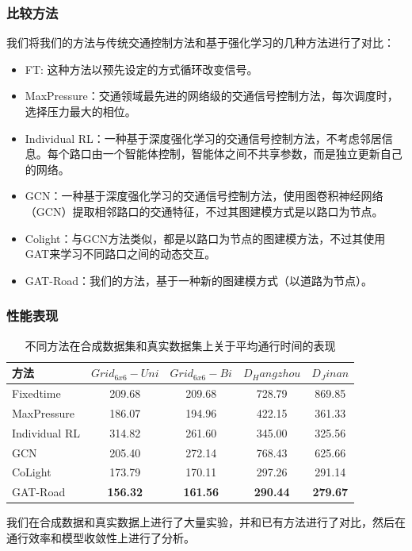 \subsubsection{比较方法}
我们将我们的方法与传统交通控制方法和基于强化学习的几种方法进行了对比：
\begin{itemize}
  \item FT\cite{koonce2008traffic}: 这种方法以预先设定的方式循环改变信号。
  \item MaxPressure\cite{varaiya2013max}：交通领域最先进的网络级的交通信号控制方法，每次调度时，选择压力最大的相位。
  \item Individual RL\cite{wei2018intellilight}：一种基于深度强化学习的交通信号控制方法，不考虑邻居信息。每个路口由一个智能体控制，智能体之间不共享参数，而是独立更新自己的网络。
  \item GCN\cite{van2016coordinated}：一种基于深度强化学习的交通信号控制方法，使用图卷积神经网络（GCN）提取相邻路口的交通特征，不过其图建模方式是以路口为节点。
  \item Colight\cite{wei2019colight}：与GCN方法类似，都是以路口为节点的图建模方法，不过其使用GAT来学习不同路口之间的动态交互。
  \item GAT-Road：我们的方法，基于一种新的图建模方式（以道路为节点）。
\end{itemize}
\subsubsection{性能表现}

\begin{table}[htb]
  \caption{不同方法在合成数据集和真实数据集上关于平均通行时间的表现}
  \label{tab:performance}
  \begin{tabular}{lcccc}
  \toprule
  方法 & $Grid_{6x6}-Uni$ & $Grid_{6x6}-Bi$ & $D_Hangzhou$ & $D_Jinan$ \\
  \hline
  Fixedtime & 209.68 & 209.68 & 728.79 & 869.85 \\
  MaxPressure & 186.07 & 194.96 &  422.15 & 361.33 \\
  \hline
  Individual RL & 314.82 & 261.60 & 345.00 & 325.56 \\
  GCN & 205.40 & 272.14 & 768.43 & 625.66 \\
  CoLight & 173.79 & 170.11 & 297.26 & 291.14 \\
  \hline
  GAT-Road & \textbf{156.32} & \textbf{161.56} & \textbf{290.44} & \textbf{279.67} \\
  \bottomrule
  \end{tabular}
\end{table}
我们在合成数据和真实数据上进行了大量实验，并和已有方法进行了对比，然后在通行效率和模型收敛性上进行了分析。

